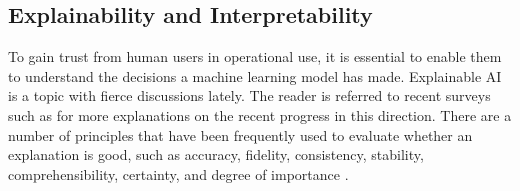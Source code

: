 \subsection*{Explainability and Interpretability}\label{sec:explainableAI}

To gain trust from human users in operational use, it is essential to enable them to understand the decisions a machine learning model has made. Explainable AI is a topic with fierce discussions lately. The reader is referred to recent surveys such as \cite{HUANG2020100270} for more explanations on the recent progress in this direction. There are a number of principles that have been frequently used to evaluate whether an explanation is good, such as accuracy, fidelity, consistency, stability, comprehensibility, certainty, and degree of importance \cite{DBLP:journals/corr/abs-1911-10104}.  